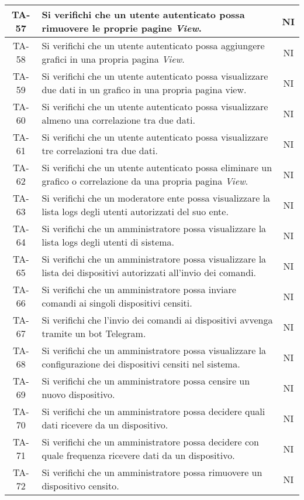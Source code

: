 \begin{center}
\begin{longtable}{|c|p{10cm}|c|}
			 \hline
			 TA-57 & Si verifichi che un utente autenticato possa rimuovere le proprie pagine \textit{View}. & NI \\
			 \hline
			 TA-58 & Si verifichi che un utente autenticato possa aggiungere grafici in una propria pagina  \textit{View}. & NI \\
			 \hline
			 TA-59 & Si verifichi che un utente autenticato possa visualizzare due dati in un grafico in una propria pagina view. & NI \\
			 \hline
			 TA-60 & Si verifichi che un utente autenticato possa visualizzare almeno una correlazione tra due dati. & NI \\
			 \hline
			 TA-61 & Si verifichi che un utente autenticato possa visualizzare tre correlazioni tra due dati. & NI \\
			 \hline
			 TA-62 & Si verifichi che un utente autenticato possa eliminare un grafico o correlazione da una propria pagina \textit{View}. & NI \\
			 \hline
			 TA-63 & Si verifichi che un moderatore ente possa visualizzare la lista logs degli utenti autorizzati del suo ente. & NI \\
			 \hline
			 TA-64 & Si verifichi che un amministratore possa visualizzare la lista logs degli utenti di sistema. & NI \\
			 \hline
			 TA-65 & Si verifichi che un amministratore possa visualizzare la lista dei dispositivi autorizzati all'invio dei comandi. & NI \\
			 \hline
			 TA-66 & Si verifichi che un amministratore possa inviare comandi ai singoli dispositivi censiti. & NI \\
			 \hline
			 TA-67 & Si verifichi che l'invio dei comandi ai dispositivi avvenga tramite un bot Telegram. & NI \\
			 \hline
			 TA-68 & Si verifichi che un amministratore possa visualizzare la configurazione dei dispositivi censiti nel sistema. & NI \\
			 \hline
			 TA-69 & Si verifichi che un amministratore possa censire un nuovo dispositivo. & NI \\
			 \hline
			 TA-70 & Si verifichi che un amministratore possa decidere quali dati ricevere da un dispositivo. & NI \\
			 \hline
			 TA-71 & Si verifichi che un amministratore possa decidere con quale frequenza ricevere dati da un dispositivo. & NI \\
			 \hline
			 TA-72 & Si verifichi che un amministratore possa rimuovere un dispositivo censito. & NI \\

\end{longtable}
\end{center}

